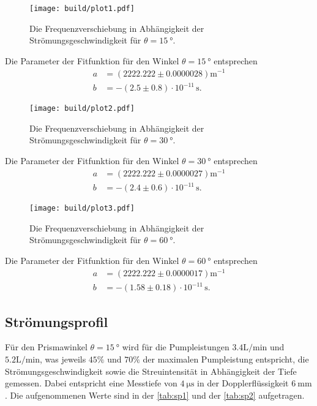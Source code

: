 \begin{figure}[H]
	\texttt{[image: build/plot1.pdf]}
	\captionsetup{width=0.765\linewidth}
	\caption{Die Frequenzverschiebung in Abhängigkeit der Strömungsgeschwindigkeit für $\theta = \qty{15}{°}$.}
	\label{fig:plot1}
\end{figure}
Die Parameter der Fitfunktion für den Winkel $\theta = \qty{15}{°}$ entsprechen
\begin{align*}
  a &= (2222.222 \pm 0.0000028) \mathrm{m}^{-1}\\
  b &= -(2.5\pm 0.8) \cdot 10^{-11}\,\mathrm{s}.
\end{align*}
\begin{figure}[H]
	\texttt{[image: build/plot2.pdf]}
	\captionsetup{width=0.765\linewidth}
	\caption{Die Frequenzverschiebung in Abhängigkeit der Strömungsgeschwindigkeit für $\theta = \qty{30}{°}$.}
	\label{fig:plot2}
\end{figure}
Die Parameter der Fitfunktion für den Winkel $\theta = \qty{30}{°}$ entsprechen
\begin{align*}
  a &= (2222.222 \pm 0.0000027) \mathrm{m}^{-1}\\
  b &= -(2.4\pm 0.6) \cdot 10^{-11}\,\mathrm{s}.
\end{align*}
\begin{figure}[H]
	\texttt{[image: build/plot3.pdf]}
	\captionsetup{width=0.765\linewidth}
	\caption{Die Frequenzverschiebung in Abhängigkeit der Strömungsgeschwindigkeit für $\theta = \qty{60}{°}$.}
	\label{fig:plot3}
\end{figure}
Die Parameter der Fitfunktion für den Winkel $\theta = \qty{60}{°}$ entsprechen
\begin{align*}
  a &= (2222.222 \pm 0.0000017) \mathrm{m}^{-1}\\
  b &= -(1.58\pm 0.18) \cdot 10^{-11}\,\mathrm{s}.
\end{align*}
\subsection{Strömungsprofil}
\label{sec:Strömungsprofil}

Für den Prismawinkel $\theta = \qty{15}{°}$ wird für die Pumpleistungen $ 3.4 \si{\liter\per\minute}$ und $ 5.2 \si{\liter\per\minute}$, was jeweils
$45\%$  und $70\%$ der maximalen Pumpleistung entspricht, die Strömungsgeschwindigkeit sowie die Streuintensität in Abhängigkeit der Tiefe gemessen.
Dabei entspricht eine Messtiefe von $\qty{4}{\micro\second}$ in der Dopplerflüssigkeit $\qty{6}{\milli\meter}$.
Die aufgenommenen Werte sind in der \autoref{tab:sp1} und der \autoref{tab:sp2} aufgetragen.

